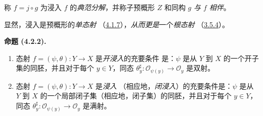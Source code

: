 \documentclass[UTF8,fontset=none,11pt,oneside,openany]{ctexbook}
\newenvironment{proposition}[1][]{%
  \par\medskip\noindent\textbf{命题 (#1).}\ %
}{\par}
\let\EGAOriginalLabel\label
\renewcommand{\label}[1]{\phantomsection\EGAOriginalLabel{#1}}
\begin{document}
称 $f=j\circ g$ 为浸入 $f$ 的\emph{典范分解}，并称子预概形 $Z$
和同构 $g$ \emph{与 $f$ 相伴}。

显然，浸入是预概形的\emph{单态射}
（\hyperref[I.4.1.7-fr]{4.1.7}），\emph{从而更是}一个\emph{根态射}
（\hyperref[I.3.5.4-fr]{3.5.4}）。

\begin{proposition}[4.2.2]
\label{I.4.2.2-fr}
\begin{enumerate}
  \item[a)] 态射 $f=(\psi,\theta):Y\to X$ 是\emph{开浸入}的充要条件
  是：$\psi$ 是从 $Y$ 到 $X$ 的一个开子集的同胚，并且对于每个
  $y\in Y$，同态
  $\theta_y^\sharp:\mathscr{O}_{\psi(y)}\to\mathscr{O}_y$ 是双射。
  \item[b)] 态射 $f=(\psi,\theta):Y\to X$ 是\emph{浸入}
  （相应地，\emph{闭浸入}）的充要条件是：$\psi$ 是从 $Y$ 到 $X$
  的一个局部闭子集（相应地，闭子集）的同胚，并且对于每个
  $y\in Y$，同态
  $\theta_y^\sharp:\mathscr{O}_{\psi(y)}\to\mathscr{O}_y$ 是满射。
\end{enumerate}
\end{proposition}
\end{document}
